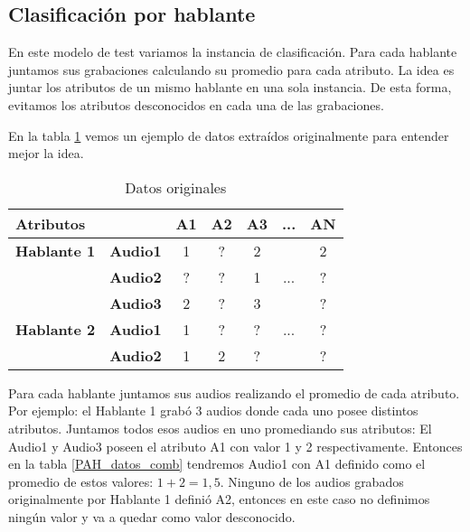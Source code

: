 \subsection{Clasificación por hablante}
\label{prom_los_atributos_de_cada_hablante}

En este modelo de test variamos la instancia de clasificación. Para cada hablante juntamos sus grabaciones  calculando su promedio para cada atributo. La idea es juntar los atributos de un mismo hablante en una sola instancia. De esta forma, evitamos los atributos desconocidos en cada una de las grabaciones. 

En la tabla \ref{datos_orig} vemos un ejemplo de datos extraídos originalmente para entender mejor la idea. 

\begin{table}[H]
	\centering
	\begin{tabular}{|l|l|ccccc|}
		\hline
		\multicolumn{2}{|l|}{Atributos} & A1 & A2 & A3 & ... & AN \\
		\hline 
		\textbf{Hablante 1} & \textbf{Audio1} & 1 & ? & 2 & & 2\\
		& \textbf{Audio2} & ? & ? & 1 & ... & ? \\
		& \textbf{Audio3} & 2 & ? & 3 & & ? \\
		\hline
		\textbf{Hablante 2} & \textbf{Audio1} & 1 & ? & ? & ... & ? \\
		& \textbf{Audio2} & 1 & 2 & ? & & ? \\
		\hline
	\end{tabular}
	\caption{Datos originales}
	\label{datos_orig}
\end{table}

Para cada hablante juntamos sus audios realizando el promedio de cada atributo. Por ejemplo: el Hablante 1 grabó 3 audios donde cada uno posee distintos atributos. Juntamos todos esos audios en uno promediando sus atributos: El Audio1 y Audio3 poseen el atributo A1 con valor 1 y 2 respectivamente. Entonces en la tabla \ref{PAH_datos_comb} tendremos Audio1 con A1 definido como el promedio de estos valores: $1 + 2 = 1,5$. Ninguno de los audios grabados originalmente por Hablante 1 definió A2, entonces en este caso no definimos ningún valor y va a quedar como valor desconocido. 


